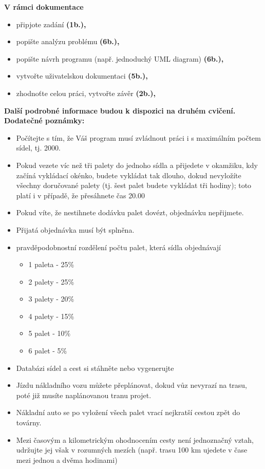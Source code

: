 \documentclass[ 12pt, a4paper]{report}
\begin{document}
\textbf{V rámci dokumentace}
\begin{itemize}
  \item připjote zadání \textbf{(1b.),}
  \item popište analýzu problému \textbf{(6b.),}
  \item popište návrh programu (např. jednoduchý UML diagram) \textbf{(6b.),}
  \item vytvořte uživatelskou dokumentaci \textbf{(5b.),}
  \item zhodnoťte celou práci, vytvořte závěr \textbf{(2b.),}
\end{itemize}
\textbf{Další podrobné informace budou k dispozici na druhém cvičení.}\newline
\textbf{Dodatečné poznámky:}
\begin{itemize}
  \item Počítejte s tím, že Váš program musí zvládnout práci i s maximálním počtem sídel, tj. 2000.
  \item Pokud vezete víc než tři palety do jednoho sídla a přijedete v okamžiku, kdy začíná vykládací okénko, budete vykládat tak dlouho, dokud nevyložíte všechny doručované palety (tj. šest palet budete vykládat tři hodiny); toto platí i v případě, že přesáhnete čas 20.00
  \item Pokud víte, že nestihnete dodávku palet dovézt, objednávku nepřijmete.
  \item Přijatá objednávka musí být splněna.
  \item pravděpodobnostní rozdělení počtu palet, která sídla objednávají
  \begin{itemize}
    \item 1 paleta - 25\%
    \item 2 palety - 25\%
    \item 3 palety - 20\%
    \item 4 palety - 15\%
    \item 5 palet - 10\%
    \item 6 palet - 5\%
  \end{itemize}
  \item Databázi sídel a cest si stáhněte nebo vygenerujte
  \item Jízdu nákladního vozu můžete přeplánovat, dokud vůz nevyrazí na trasu, poté již musíte naplánovanou tranu projet.
  \item Nákladní auto se po vyložení všech palet vrací nejkratší cestou zpět do továrny.
  \item Mezi časovým a kilometrickým ohodnocením cesty není jednoznačný vztah, udržujte jej však v rozumných mezích (např. trasu 100 km ujedete v čase mezi jednou a dvěma hodinami)
\end{itemize}
\end{document}
